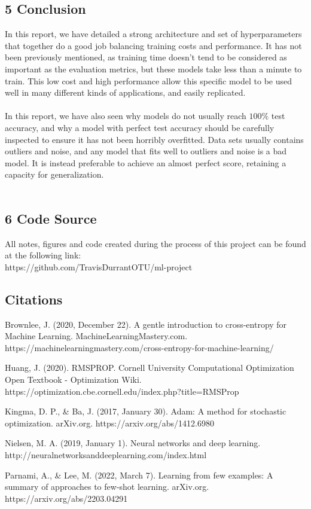 \documentclass{article}
\begin{document}
\subsection*{5 Conclusion}
In this report, we have detailed a strong architecture and set of hyperparameters that together do a good job balancing training costs and performance. It has not been previously mentioned, as training time doesn't tend to be considered as important as the evaluation metrics, but these models take less than a minute to train. This low cost and high performance allow this specific model to be used well in many different kinds of applications, and easily replicated.\\\\
In this report, we have also seen why models do not usually reach $100\%$ test accuracy, and why a model with perfect test accuracy should be carefully inspected to ensure it has not been horribly overfitted. Data sets usually contains outliers and noise, and any model that fits well to outliers and noise is a bad model. It is instead preferable to achieve an almost perfect score, retaining a capacity for generalization.\\\\
\subsection*{6 Code Source}
All notes, figures and code created during the process of this project can be found at the following link:\\
https://github.com/TravisDurrantOTU/ml-project
\pagebreak
\subsection*{Citations}
\begin{hangparas}{0.5 in}{1}
Brownlee, J. (2020, December 22). A gentle introduction to cross-entropy for Machine Learning. MachineLearningMastery.com. https://machinelearningmastery.com/cross-entropy-for-machine-learning/\newline

Huang, J. (2020). RMSPROP. Cornell University Computational Optimization Open Textbook - Optimization Wiki. https://optimization.cbe.cornell.edu/index.php?title=RMSProp \newline

Kingma, D. P., \& Ba, J. (2017, January 30). Adam: A method for stochastic optimization. arXiv.org. https://arxiv.org/abs/1412.6980\newline

Nielsen, M. A. (2019, January 1). Neural networks and deep learning. \newline http://neuralnetworksanddeeplearning.com/index.html\newline

Parnami, A., \& Lee, M. (2022, March 7). Learning from few examples: A summary of approaches to few-shot learning. arXiv.org. https://arxiv.org/abs/2203.04291\newline

\end{hangparas}
\end{document}
